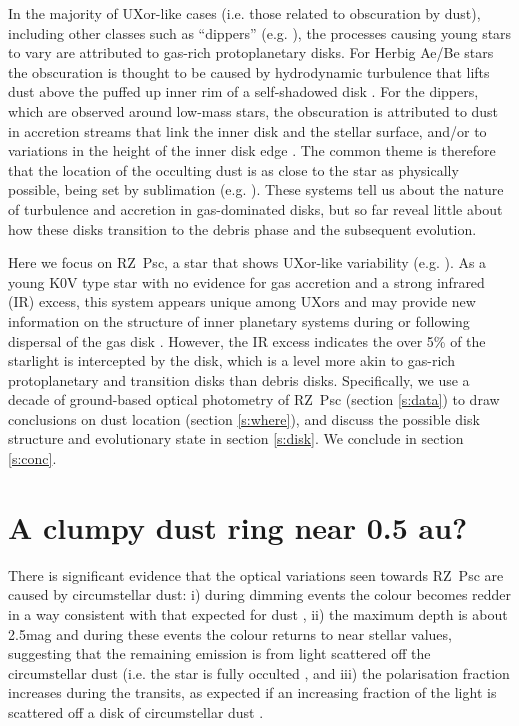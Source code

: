 \documentclass[]{rsos}
\begin{document}
In the majority of UXor-like cases (i.e. those related to obscuration by dust), including
other classes such as ``dippers'' (e.g. \cite{2014AJ....147...82C,2016ApJ...816...69A}),
the processes causing young stars to vary are attributed to gas-rich protoplanetary
disks. For Herbig Ae/Be stars the obscuration is thought to be caused by hydrodynamic
turbulence that lifts dust above the puffed up inner rim of a self-shadowed disk
\cite{2003ApJ...594L..47D}. For the dippers, which are observed around low-mass stars,
the obscuration is attributed to dust in accretion streams that link the inner disk and
the stellar surface, and/or to variations in the height of the inner disk edge
\cite{1999A&A...349..619B,2016ApJ...816...69A,2016arXiv160503985B}. The common theme is
therefore that the location of the occulting dust is as close to the star as physically
possible, being set by sublimation (e.g. \cite{2007prpl.conf..539M}). These systems tell
us about the nature of turbulence and accretion in gas-dominated disks, but so far reveal
little about how these disks transition to the debris phase and the subsequent evolution.

Here we focus on RZ~Psc, a star that shows UXor-like variability
(e.g. \cite{1985PZ.....22..181Z,1999A&AS..140..293G,2003ARep...47..580S}). As a young K0V
type star with no evidence for gas accretion and a strong infrared (IR) excess, this
system appears unique among UXors and may provide new information on the structure of
inner planetary systems during or following dispersal of the gas disk
\cite{2010A&A...524A...8G,2013A&A...553L...1D}. However, the IR excess indicates the over
5\% of the starlight is intercepted by the disk, which is a level more akin to gas-rich
protoplanetary and transition disks than debris disks. Specifically, we use a decade of
ground-based optical photometry of RZ~Psc (section \ref{s:data}) to draw conclusions on
dust location (section \ref{s:where}), and discuss the possible disk structure and
evolutionary state in section \ref{s:disk}. We conclude in section \ref{s:conc}.

\section{A clumpy dust ring near 0.5 au?}\label{s:rzpscintro}

There is significant evidence that the optical variations seen towards RZ~Psc are caused
by circumstellar dust: i) during dimming events the colour becomes redder
\cite{1985PZ.....22..181Z,1980PZ.....21..310K} in a way consistent with that expected for
dust \cite{1981Afz....17...87P,2004ARep...48..470P}, ii) the maximum depth is about
2.5mag and during these events the colour returns to near stellar values, suggesting that
the remaining emission is from light scattered off the circumstellar dust (i.e. the star
is fully occulted \cite{1981Afz....17...87P,1988SvAL...14...27G}, and iii) the
polarisation fraction increases during the transits, as expected if an increasing
fraction of the light is scattered off a disk of circumstellar dust
\cite{1988SvAL...14...27G,1991Afz....34..333K,2003ARep...47..580S}.
\end{document}
